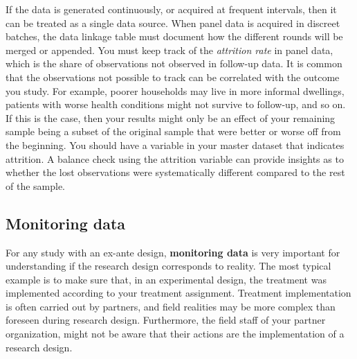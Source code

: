 If the data is generated continuously,
or acquired at frequent intervals,
then it can be treated as a single data source.
When panel data is acquired in discreet batches,
the data linkage table must document
how the different rounds will be merged or appended.
You must keep track of the \textit{attrition rate} in panel data,
which is the share of observations not observed in follow-up data.
It is common that the observations not possible to track
can be correlated with the outcome you study.
For example, poorer households may live in more informal dwellings,
patients with worse health conditions might not survive to follow-up,
and so on.
If this is the case,
then your results might only be an effect of your remaining sample
being a subset of the original sample
that were better or worse off from the beginning.
You should have a variable in your master dataset
 that indicates attrition.
A balance check using the attrition variable
can provide insights as to whether the lost observations
were systematically different
compared to the rest of the sample.

\subsection{Monitoring data}

For any study with an ex-ante design,
\textbf{monitoring data}
is very important for understanding if the
research design corresponds to reality.
The most typical example is to make sure that,
in an experimental design,
the treatment was implemented according to your treatment assignment.
Treatment implementation is often carried out by partners,
and field realities may be more complex than foreseen during research design.
Furthermore, the field staff of your partner organization,
might not be aware that their actions are the implementation of a research design.

